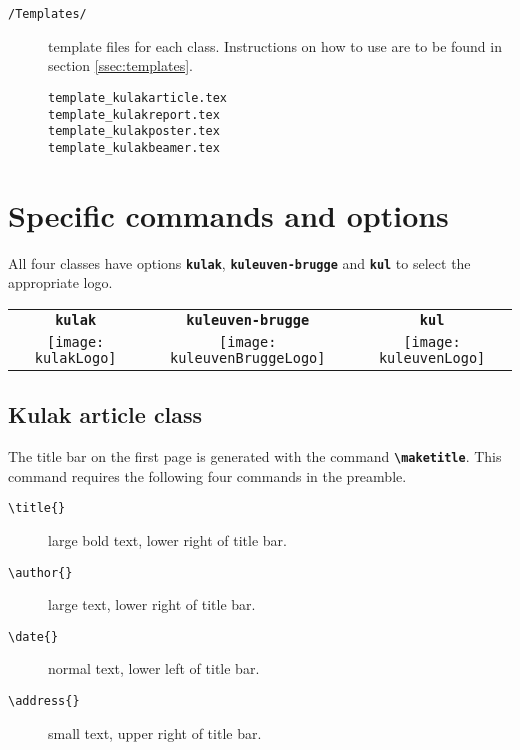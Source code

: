 \documentclass[kulak]{kulakarticle} %
\begin{document}
\begin{description}
\begin{description}
\end{description}
\item[\texttt{/Templates/}] template files for each class. Instructions on how to use are to be found in section \ref{ssec:templates}.
\begin{description}
\item[\texttt{template\_kulakarticle.tex}]
\item[\texttt{template\_kulakreport.tex}]
\item[\texttt{template\_kulakposter.tex}]  
\item[\texttt{template\_kulakbeamer.tex}]  
\end{description}
\end{description}

\section{Specific commands and options}
All four classes have options \textbf{\texttt{kulak}}, \textbf{\texttt{kuleuven-brugge}} and \textbf{\texttt{kul}} to select the appropriate logo.
\begin{center}
\begin{tabular}{c|c|c}
\textbf{\texttt{kulak}} & \textbf{\texttt{kuleuven-brugge}} & \textbf{\texttt{kul}}\\
\texttt{[image: kulakLogo]} & \texttt{[image: kuleuvenBruggeLogo]} & \texttt{[image: kuleuvenLogo]}
\end{tabular}
\end{center}

\subsection{Kulak article class}

The title bar on the first page is generated with the command \textbf{\texttt{\textbackslash maketitle}}. This command requires the following four commands in the preamble.
\begin{description}
\item[\texttt{\textbackslash title\{\}}] large bold text, lower right of title bar.
\item[\texttt{\textbackslash author\{\}}] large text, lower right of title bar.
\item[\texttt{\textbackslash date\{\}}] normal text, lower left of title bar.
\item[\texttt{\textbackslash address\{\}}] small text, upper right of title bar.
\end{description}
\end{document}
